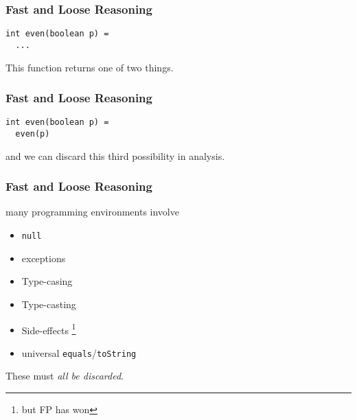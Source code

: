 \begin{frame}[fragile]
\frametitle{Fast and Loose Reasoning}
\begin{lstlisting}
int even(boolean p) =
  ...
\end{lstlisting}
This function returns one of two things.
\end{frame}

\begin{frame}[fragile]
\frametitle{Fast and Loose Reasoning}
\begin{lstlisting}[style=scala]
int even(boolean p) =
  even(p)
\end{lstlisting}
and we can discard this third possibility in analysis.
\end{frame}

\begin{frame}[fragile]
\frametitle{Fast and Loose Reasoning}
\begin{block}{many programming environments involve}
\begin{itemize}
  \item \lstinline{null}
  \item exceptions
  \item Type-casing
  \item Type-casting
  \item Side-effects \footnote{but FP has won}
  \item universal \lstinline{equals}/\lstinline{toString}
\end{itemize}
\end{block}
These must \emph{all be discarded}.
\end{frame}

